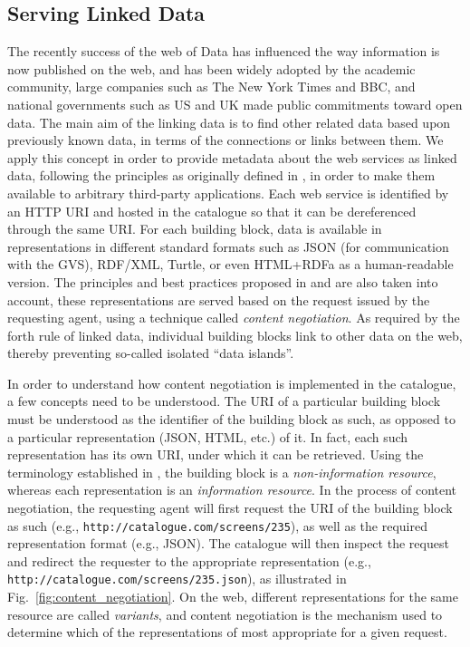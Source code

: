 
\subsection{Serving Linked Data} %
\label{sub:linked_data}

The recently success of the web of Data has influenced the way information is now published on the web, and has been widely adopted by the academic community, large companies such as The New York Times and BBC, and national governments such as US and UK made public commitments toward open data. The main aim of the linking data is to find other related data based upon previously known data, in terms of the connections or links between them. We apply this concept in order to provide metadata about the web services as linked data, following the principles as originally defined in \cite{bizer_ijswis2009}, in order to make them available to arbitrary third-party applications. Each web service is identified by an HTTP URI and hosted in the catalogue so that it can be dereferenced through the same URI. For each building block, data is available in representations in different standard formats such as JSON (for communication with the GVS), RDF/XML, Turtle, or even HTML+RDFa as a human-readable version. The principles and best practices proposed in \cite{berrueta2008} and \cite{sauermann2008cool_uris} are also taken into account, these representations are served based on the request issued by the requesting agent, using a technique called \emph{content negotiation}. As required by the forth rule of linked data, individual building blocks link to other data on the web, thereby preventing so-called isolated ``data islands''.

In order to understand how content negotiation is implemented in the catalogue, a few concepts need to be understood. The URI of a particular building block must be understood as the identifier of the building block as such, as opposed to a particular representation (JSON, HTML, etc.) of it. In fact, each such representation has its own URI, under which it can be retrieved. Using the terminology established in \cite{w3c2004webArchitecture}, the building block is a \emph{non-information resource}, whereas each representation is an \emph{information resource}. In the process of content negotiation, the requesting agent will first request the URI of the building block as such (e.g., \texttt{http://catalogue.com/screens/235}), as well as the required representation format (e.g., JSON). The catalogue will then inspect the request and redirect the requester to the appropriate representation (e.g., \texttt{http://catalogue.com/screens/235.json}), as illustrated in Fig.~\ref{fig:content_negotiation}.
On the web, different representations for the same resource are called \emph{variants}, and content negotiation is the mechanism used to determine which of the representations of most appropriate for a given request.

